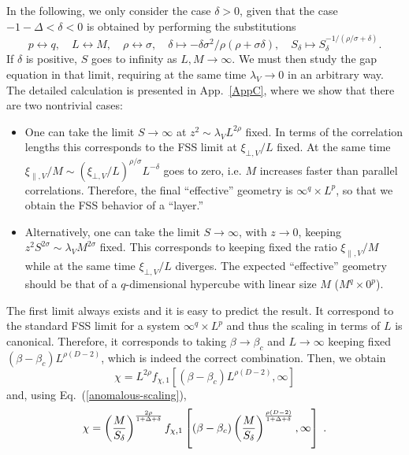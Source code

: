 \documentclass[a4paper,12pt]{article}
\begin{document}
In the following, we only consider the case $\delta>0$, given that
the case $-1-\Delta<\delta<0$ is obtained by performing
the substitutions 
\begin{equation}
  p\leftrightarrow q,\quad L\leftrightarrow M,\quad
\rho \leftrightarrow \sigma, \quad
\delta \mapsto -{\delta \sigma^2/\rho(\rho + \sigma \delta)}, \quad
S_\delta \mapsto S_\delta^{-1/(\rho/\sigma+\delta)}.
\end{equation}
If $\delta$ is positive, $S$ goes to infinity as $L, M \to\infty$. 
We must then study the gap 
equation in that limit, requiring at the same time $\lambda_V\to 0$ 
in an arbitrary way. The detailed calculation is presented in 
App.~\ref{AppC}, where we show that there are two nontrivial cases:
\begin{itemize}
%
\item[(a)]
One can take the limit $S\to \infty$ at $z^2\sim\lambda_V L^{2\rho}$ fixed. 
In terms of the correlation lengths this corresponds to the FSS limit 
at $\xi_{\bot,V}/L$ fixed. At the same time 
$\xi_{\|,V}/M \sim (\xi_{\bot,V}/L)^{\rho/\sigma} L^{-\delta}$ goes to 
zero, i.e. $M$ increases faster than parallel correlations. Therefore,
the final ``effective'' geometry is $\infty^q \times L^p$, so that 
we obtain the FSS behavior of a ``layer.''
\item[(b)]
Alternatively, one can take the limit $S\to \infty$, with $z\to 0$,
keeping $z^2 S^{2\sigma}\sim \lambda_V M^{2\sigma}$ fixed. This corresponds to 
keeping fixed the ratio $\xi_{\|,V}/M$ while at the same time 
$\xi_{\bot,V}/L$ diverges. The expected ``effective''
geometry should be that of a $q$-dimensional hypercube with linear
size  $M$ ($M^q \times 0^p$).
\end{itemize}
The first limit always exists and it is easy to predict the result.
It correspond to the standard FSS limit for a system $\infty^q \times L^p$
and thus the scaling in terms of $L$ is canonical. Therefore,
it corresponds to taking $\beta\to \beta_c$ and 
$L \to \infty$ keeping fixed $(\beta - \beta_c) L^{\rho (D-2)}$, which 
is indeed the correct combination. Then, we obtain 
\begin{equation}
\chi = L^{2\rho} f_{\chi,1}[
   (\beta - \beta_c) L^{\rho(D-2)},\infty]
\label{chi-scal-(a)-L}
\end{equation}
and, using Eq.~(\ref{anomalous-scaling}), 
\begin{equation}
\chi = \left(M\over S_\delta\right)^{{2\rho\over 1 + \Delta + \delta}}
f_{\chi,1}\left[
   (\beta - \beta_c) 
   \left(M\over S_\delta\right)^{{\rho (D-2)\over 1 + \Delta + \delta}},
         \infty\right]\; .
\label{chi-scal-(a)-M}
\end{equation}
\end{document}
